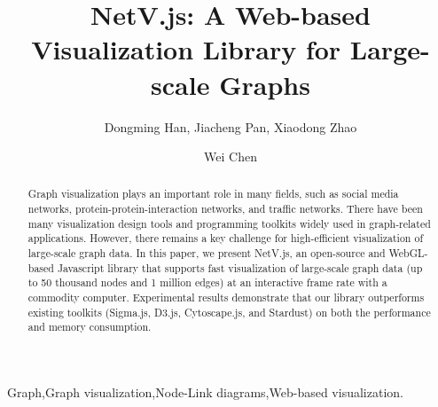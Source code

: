 \documentclass[5p]{elsarticle}
\newcommand{\name}{NetV.js\xspace}
\begin{document}
\begin{CJK}{UTF8}{gbsn}
\begin{frontmatter}

\title{\name: A Web-based Visualization Library for Large-scale Graphs}

\author[mymainaddress,mysecondaryaddress]{Dongming Han, Jiacheng Pan, Xiaodong Zhao}
\author[mymainaddress]{Wei Chen}

\address[mymainaddress]{State Key Lab of CAD\&CG, Zhejiang University, Hangzhou, Zhejiang, China}
\address[mysecondaryaddress]{Zhejiang Lab, hangzhou, zhejiang, China}

\begin{abstract}
    Graph visualization plays an important role in many fields, such as social media networks, protein-protein-interaction networks, and traffic networks. There have been many visualization design tools and programming toolkits widely used in graph-related applications. However, there remains a key challenge for high-efficient visualization of large-scale graph data. In this paper, we present \name, an open-source and WebGL-based Javascript library that supports fast visualization of large-scale graph data (up to 50 thousand nodes and 1 million edges) at an interactive frame rate with a commodity computer. Experimental results demonstrate that our library outperforms existing toolkits (Sigma.js, D3.js, Cytoscape.js, and Stardust) on both the performance and memory consumption.

\end{abstract}

\begin{keyword}
Graph\sep Graph visualization\sep Node-Link diagrams\sep Web-based visualization.
\end{keyword}

\end{frontmatter}

\linenumbers









\end{CJK}
\end{document}
